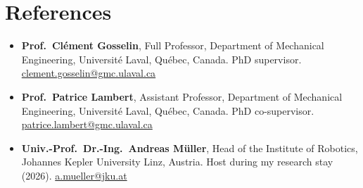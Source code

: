 \documentclass[10pt,a4paper]{article}
\begin{document}
\section{References}
\begin{itemize}
\item \textbf{Prof.~Cl\'ement Gosselin}, Full Professor, Department of Mechanical Engineering, Universit\'e Laval, Qu\'ebec,
Canada. PhD supervisor. \href{mailto:clement.gosselin@gmc.ulaval.ca}{clement.gosselin@gmc.ulaval.ca}
\item \textbf{Prof.~Patrice Lambert}, Assistant Professor, Department of Mechanical Engineering, Universit\'e Laval,
Qu\'ebec, Canada. PhD co-supervisor. \href{mailto:patrice.lambert@gmc.ulaval.ca}{patrice.lambert@gmc.ulaval.ca}
\item \textbf{Univ.-Prof.~Dr.-Ing.~Andreas M\"uller}, Head of the Institute of Robotics, Johannes Kepler University Linz,
Austria. Host during my research stay (2026). \href{mailto:a.mueller@jku.at}{a.mueller@jku.at}
\end{itemize}
\end{document}
